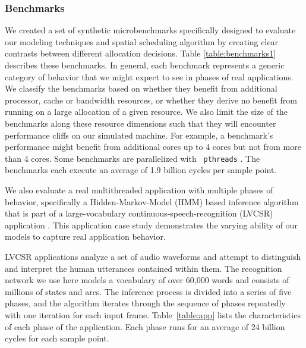 \subsubsection*{Benchmarks}
We created a set of synthetic microbenchmarks specifically designed to evaluate our modeling techniques and spatial scheduling algorithm by creating clear contrasts between different allocation decisions.  Table \ref{table:benchmarks1} describes these benchmarks.  In general, each benchmark represents a generic category of behavior that we might expect to see in phases of real applications.  We classify the benchmarks based on whether they benefit from additional processor, cache or bandwidth resources, or whether they derive no benefit from running on a large allocation of a given resource.  We also limit the size of the benchmarks along these resource dimensions such that they will encounter performance cliffs on our simulated machine.  For example, a benchmark's performance might benefit from additional cores up to 4 cores but not from more than 4 cores.   Some benchmarks are parallelized with \texttt{ pthreads} \cite{pthreads}.  The benchmarks each execute an average of 1.9 billion cycles per sample point.

We also evaluate a real multithreaded application with multiple phases of behavior, specifically
a Hidden-Markov-Model (HMM) based inference algorithm that is part of a large-vocabulary continuous-speech-recognition (LVCSR) application \cite{chong-eama08, huang-speech}. This application case study demonstrates the varying ability of our models to capture real application behavior.

LVCSR applications analyze a set of audio waveforms and attempt to distinguish and interpret the human utterances contained within them. The recognition network we use here models a vocabulary of over 60,000 words and consists of millions of states and arcs. The inference process is divided into a series of five phases, and the algorithm iterates through the sequence of phases repeatedly with one iteration for each input frame. Table~\ref{table:app} lists the characteristics of each phase of the application.  Each phase runs for an average of 24 billion cycles for each sample point.

